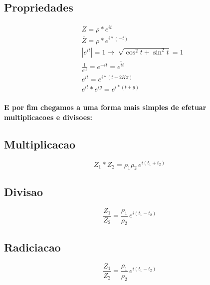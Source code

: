 \documentclass[12pt,twoside, a4paper, twocolumn]{article}
\begin{document}
\subsection{Propriedades}
\begin{equation*}
    \begin{aligned}
         & Z             = \rho * e^{it}                                         \\
         & \overline{Z}  = \rho * e^{i * \left(-t\right)}                        \\
         & | e^{it} |    = 1      \rightarrow \sqrt[]{\cos^2{t} + \sin^2{t}} = 1 \\
         & \frac{1}{e^{it}  } = e^{-it} = \overline{e^{it}  }                    \\
         & e^{it}  = e^{i*(t+2K\pi)}                                             \\
         & e^{it}  * e^{ig} = e^{i* (t+g)}
    \end{aligned}
\end{equation*}

\paragraph*{E por fim chegamos a uma forma mais simples de efetuar multiplicacoes e divisoes:}

\subsection{Multiplicacao}
\begin{equation}
    Z_1 * Z_2  = \rho_1  \rho_2 \, e^{i(t_1 + t_2)}
\end{equation}
\subsection{Divisao}
\begin{equation}
    \frac{Z_1}{Z_2}  = \frac{\rho_1  }{\rho_2}  \, e^{i(t_1 - t_2)}
\end{equation}

\subsection{Radiciacao}

\begin{equation}
    \frac{Z_1}{Z_2}  = \frac{\rho_1  }{\rho_2}  \, e^{i(t_1 - t_2)}
\end{equation}
\end{document}
